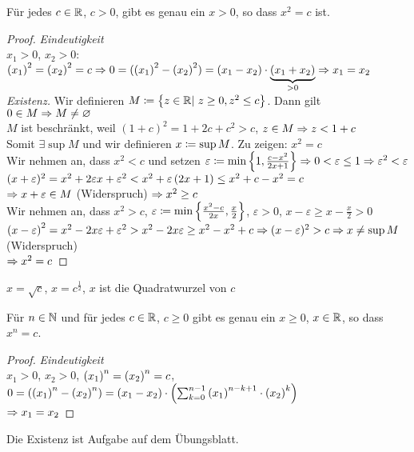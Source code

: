 \begin{satz}
    \marginnote{[16. Nov]}
    Für jedes $c\in\mathbb{R}$, $c>0$, gibt es genau ein $x>0$, so dass $x^2 = c$ ist.
    \begin{proof}
        \textit{Eindeutigkeit}\\
        $x_1>0$, $x_2>0$: $\left(x_1\right)^2 = \left(x_2\right)^2 = c \Rightarrow{} 0 = (\left(x_1\right)^2-\left(x_2\right)^2) = (x_1-x_2) \cdot \underbrace{(x_1+x_2)}_{>0} \Rightarrow{} x_1 = x_2$\\
        \textit{Existenz.} Wir definieren $M\coloneqq\left\{z\in\mathbb{R}|~z\geq 0, z^2 \leq c\right\}$. Dann gilt $0\in M \Rightarrow{} M\neq \varnothing$\\[10pt]
        $M$ ist beschränkt, weil $(1+c)^2=1+2c+c^2 > c$, \quad$z\in M \Rightarrow{} z < 1 + c$\\
        Somit $\exists \sup M$ und wir definieren $x\coloneqq \sup M$. Zu zeigen: $x^2 = c$\\[10pt]
        Wir nehmen an, dass $x^2<c$ und setzen $\varepsilon \coloneqq \min\left\{1, \frac{c-x^2}{2x+1}\right\} \Rightarrow{} 0 < \varepsilon \leq 1 \Rightarrow{} \varepsilon^2 < \varepsilon$\\
        $(x+\varepsilon)^2 = x^2 + 2\varepsilon x + \varepsilon^2 < x^2+\varepsilon\left(2x+1\right)\leq x^2+c-x^2=c$\\
        $\Rightarrow{} x+\varepsilon\in M$ (Widerspruch) $\Rightarrow{} x^2 \geq c$\\[10pt]
        Wir nehmen an, dass $x^2 > c$, $\varepsilon \coloneqq\min\left\{\frac{x^2-c}{2x}, \frac{x}{2}\right\}$, $\varepsilon > 0$, $x-\varepsilon \geq x-\frac{x}{2}>0$\\
        $\left(x-\varepsilon\right)^2 = x^2 - 2 x\varepsilon + \varepsilon^2 > x^2-2x\varepsilon \geq x^2-x^2+c\Rightarrow{} (x-\varepsilon)^2 > c \Rightarrow{} x\neq \sup M$ (Widerspruch)\\[10pt]
        $\Rightarrow{} x^2 = c$
    \end{proof}
\end{satz}

\begin{bemerkung}
    $x=\sqrt {c}$, $x=c^{\frac{1}{2}}$, $x$ ist die Quadratwurzel von $c$
\end{bemerkung}

\begin{satz}
    Für $n\in\mathbb{N}$ und für jedes $c\in\mathbb{R}$, $c\geq 0$ gibt es genau ein $x \geq 0$, $x\in\mathbb{R}$, so dass $x^n = c$.
    \begin{proof}
        \textit{Eindeutigkeit}\\
        $x_1>0$, $x_2>0$, $\left(x_1\right)^n=\left(x_2\right)^n = c$, $0=\left(\left(x_1\right)^n-\left(x_2\right)^n\right) = \left(x_1 - x_2\right)\cdot\left(\sum_{k=0}^{n-1} \left(x_1\right)^{n-k+1}\cdot \left(x_2\right)^k\right)$\\
        $\Rightarrow{} x_1 = x_2$
    \end{proof}
    \noindent Die Existenz ist Aufgabe auf dem Übungsblatt.
\end{satz}


